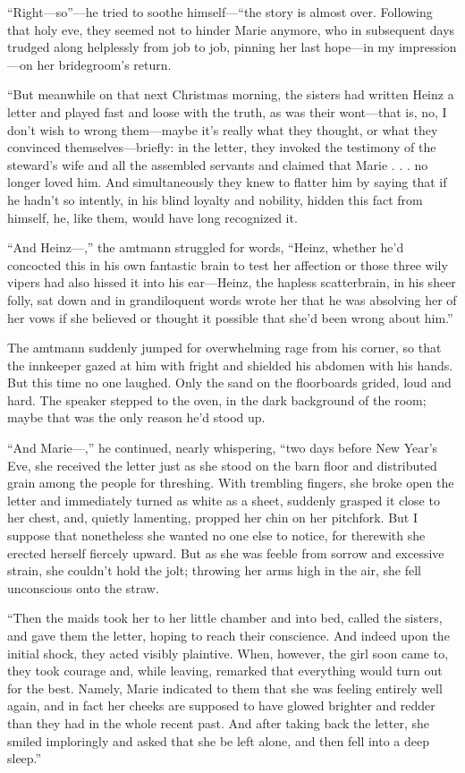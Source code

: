 \documentclass[12pt,a4paper]{article}
\begin{document}
“Right—so”—he tried to soothe himself—“the story is almost over. Following that holy eve, they seemed not to hinder Marie anymore, who in subsequent days trudged along helplessly from job to job, pinning her last hope—in my impression—on her bridegroom’s return.

“But meanwhile on that next Christmas morning, the sisters had written Heinz a letter and played fast and loose with the truth, as was their wont—that is, no, I don’t wish to wrong them—maybe it’s really what they thought, or what they convinced themselves—briefly: in the letter, they invoked the testimony of the steward’s wife and all the assembled servants and claimed that Marie . . . no longer loved him. And simultaneously they knew to flatter him by saying that if he hadn’t so intently, in his blind loyalty and nobility, hidden this fact from himself, he, like them, would have long recognized it.

“And Heinz—,” the amtmann struggled for words, “Heinz, whether he’d concocted this in his own fantastic brain to test her affection or those three wily vipers had also hissed it into his ear—Heinz, the hapless scatterbrain, in his sheer folly, sat down and in grandiloquent words wrote her that he was absolving her of her vows if she believed or thought it possible that she’d been wrong about him.”

The amtmann suddenly jumped for overwhelming rage from his corner, so that the innkeeper gazed at him with fright and shielded his abdomen with his hands. But this time no one laughed. Only the sand on the floorboards grided, loud and hard. The speaker stepped to the oven, in the dark background of the room; maybe that was the only reason he’d stood up.

“And Marie—,” he continued, nearly whispering, “two days before New Year’s Eve, she received the letter just as she stood on the barn floor and distributed grain among the people for threshing. With trembling fingers, she broke open the letter and immediately turned as white as a sheet, suddenly grasped it close to her chest, and, quietly lamenting, propped her chin on her pitchfork. But I suppose that nonetheless she wanted no one else to notice, for therewith she erected herself fiercely upward. But as she was feeble from sorrow and excessive strain, she couldn’t hold the jolt; throwing her arms high in the air, she fell unconscious onto the straw.

“Then the maids took her to her little chamber and into bed, called the sisters, and gave them the letter, hoping to reach their conscience. And indeed upon the initial shock, they acted visibly plaintive. When, however, the girl soon came to, they took courage and, while leaving, remarked that everything would turn out for the best. Namely, Marie indicated to them that she was feeling entirely well again, and in fact her cheeks are supposed to have glowed brighter and redder than they had in the whole recent past. And after taking back the letter, she smiled imploringly and asked that she be left alone, and then fell into a deep sleep.”
\end{document}
